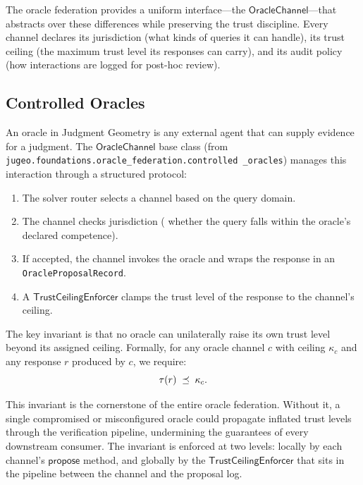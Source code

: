 \documentclass[11pt]{article}
\newcommand{\OPRec}{\texttt{OracleProposalRecord}}
\begin{document}
The oracle federation provides a uniform interface---the
$\mathsf{OracleChannel}$---that abstracts over these differences
while preserving the trust discipline.  Every channel declares its
jurisdiction (what kinds of queries it can handle), its trust
ceiling (the maximum trust level its responses can carry), and its
audit policy (how interactions are logged for post-hoc review).

\subsection{Controlled Oracles}\label{sec:controlled}

An oracle in Judgment Geometry is any external agent that can
supply evidence for a judgment.  The $\mathsf{OracleChannel}$ base
class (from \texttt{jugeo.foundations.oracle\_federation.controlled%
\_oracles}) manages this interaction through a structured protocol:

\begin{enumerate}
  \item The solver router selects a channel based on the query
    domain.
  \item The channel checks jurisdiction (\ie{} whether the query
    falls within the oracle's declared competence).
  \item If accepted, the channel invokes the oracle and wraps the
    response in an \OPRec{}.
  \item A $\mathsf{TrustCeilingEnforcer}$ clamps the trust level
    of the response to the channel's ceiling.
\end{enumerate}

The key invariant is that no oracle can unilaterally raise its own
trust level beyond its assigned ceiling.  Formally, for any oracle
channel $c$ with ceiling $\kappa_c$ and any response $r$ produced
by $c$, we require:
\begin{equation}\label{eq:ceiling}
  \tau(r) \;\preceq\; \kappa_c.
\end{equation}

This invariant is the cornerstone of the entire oracle federation.
Without it, a single compromised or misconfigured oracle could
propagate inflated trust levels through the verification pipeline,
undermining the guarantees of every downstream consumer.  The
invariant is enforced at two levels: locally by each channel's
$\mathsf{propose}$ method, and globally by the
$\mathsf{TrustCeilingEnforcer}$ that sits in the pipeline between
the channel and the proposal log.
\end{document}
